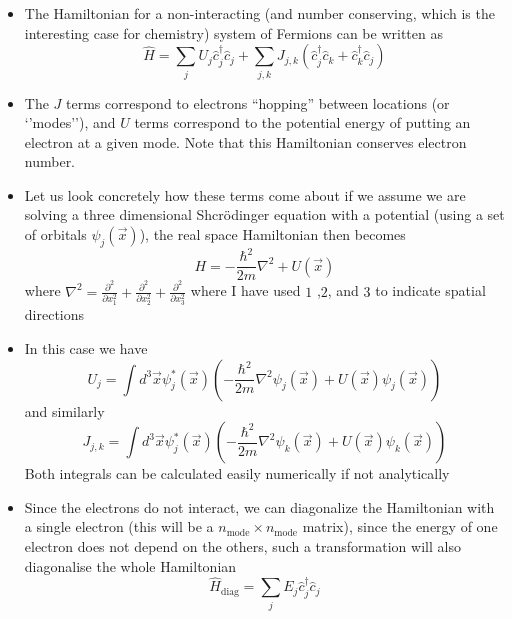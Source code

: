 \documentclass[english]{article}
\begin{document}
\begin{itemize}
\section{Non-interacting Bosons and Fermions}
\item The Hamiltonian for a non-interacting (and number conserving, which is the interesting case for chemistry) system of Fermions can be written as
\begin{equation}
\hat{H}=\sum_{j}U_j\hat{c}^\dagger_j\hat{c}_j+\sum_{j,k}J_{j,k}\left(\hat{c}^\dagger_j\hat{c}_k+\hat{c}^\dagger_k\hat{c}_j\right)
\end{equation}
\item The $J$ terms correspond to electrons ``hopping'' between locations (or `'modes''), and $U$ terms correspond to the potential energy of putting an electron at a given mode. Note that this Hamiltonian conserves electron number.
\item Let us look concretely how these terms come about if we assume we are solving a three dimensional Shcr{\"o}dinger equation with a potential (using a set of orbitals $\psi_j(\vec{x})$), the real space Hamiltonian then becomes 
\begin{equation}
H=-\frac{\hbar^2}{2m}\nabla^2+U(\vec{x})
\end{equation}
where $\nabla^2=\frac{\partial^2}{\partial x_1^2}+\frac{\partial^2}{\partial x_2^2}+\frac{\partial^2}{\partial x_3^2}$ where I have used $1$ ,$2$, and $3$ to indicate spatial directions
\item In this case we have 
\begin{equation}
U_j=\int d^3\vec{x}\psi^*_j(\vec{x})\left(-\frac{\hbar^2}{2m}\nabla^2\psi_j(\vec{x})+U(\vec{x})\psi_j(\vec{x}) \right)
\end{equation}
and similarly
\begin{equation}
J_{j,k}=\int d^3\vec{x}\psi^*_j(\vec{x})\left(-\frac{\hbar^2}{2m}\nabla^2\psi_k(\vec{x})+U(\vec{x})\psi_k(\vec{x}) \right)
\end{equation}
Both integrals can be calculated easily numerically if not analytically
\item Since the electrons do not interact, we can diagonalize the Hamiltonian with a single electron (this will be a $n_\mathrm{mode}\times n_\mathrm{mode}$ matrix), since the energy of one electron does not depend on the others, such a transformation will also diagonalise the whole Hamiltonian
\begin{equation}
\hat{H}_{\mathrm{diag}}=\sum_{j}E_j\hat{c}^\dagger_j\hat{c}_j
\end{equation}

\end{itemize}
\end{document}
